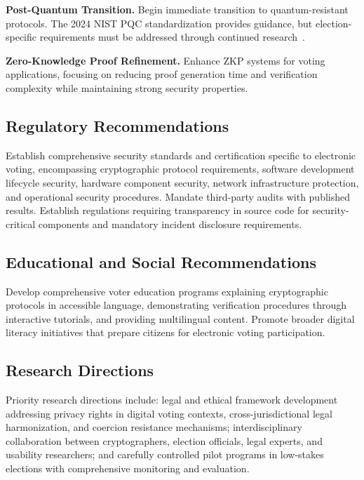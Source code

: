 \documentclass[sigconf,nonacm]{acmart}
\begin{document}
\textbf{Post-Quantum Transition.} Begin immediate transition to quantum-resistant
protocols. The 2024 NIST PQC standardization provides guidance, but election-specific
requirements must be addressed through continued research~\cite{hastings2011nistir}.

\textbf{Zero-Knowledge Proof Refinement.} Enhance ZKP systems for voting applications,
focusing on reducing proof generation time and verification complexity while maintaining
strong security properties.

\subsection{Regulatory Recommendations}

Establish comprehensive security standards and certification specific to electronic
voting, encompassing cryptographic protocol requirements, software development lifecycle
security, hardware component security, network infrastructure protection, and operational
security procedures. Mandate third-party audits with published results. Establish
regulations requiring transparency in source code for security-critical components and
mandatory incident disclosure requirements.

\subsection{Educational and Social Recommendations}

Develop comprehensive voter education programs explaining cryptographic protocols in
accessible language, demonstrating verification procedures through interactive tutorials,
and providing multilingual content. Promote broader digital literacy initiatives that
prepare citizens for electronic voting participation.

\subsection{Research Directions}

Priority research directions include: legal and ethical framework development addressing
privacy rights in digital voting contexts, cross-jurisdictional legal harmonization, and
coercion resistance mechanisms; interdisciplinary collaboration between cryptographers,
election officials, legal experts, and usability researchers; and carefully controlled
pilot programs in low-stakes elections with comprehensive monitoring and evaluation.
\end{document}
